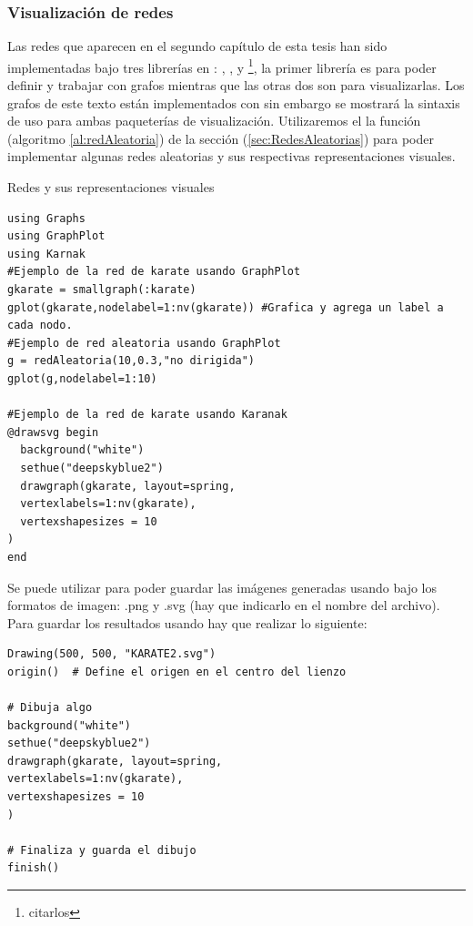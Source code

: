\subsubsection{Visualización de redes}

Las redes que aparecen en el segundo capítulo de esta tesis han sido implementadas bajo tres librerías en \julia: \href{https://github.com/JuliaGraphs/Graphs.jl}{}, \href{https://github.com/JuliaGraphs/GraphPlot.jl}{}, y \href{https://github.com/cormullion/Karnak.jl}{}\footnote{citarlos}, la primer librería es para poder definir y trabajar con grafos mientras que las otras dos son para visualizarlas. Los grafos de este texto están implementados con  sin embargo se mostrará la sintaxis de uso para ambas paqueterías de visualización. Utilizaremos el la función  (algoritmo \ref{al:redAleatoria}) de la sección (\ref{sec:RedesAleatorias}) para poder implementar algunas redes aleatorias y sus respectivas representaciones visuales.
\begin{algorithm}
	\caption{Redes y sus representaciones visuales}
	\label{al:implementacionRedes}
	\begin{verbatim}
using Graphs
using GraphPlot
using Karnak
#Ejemplo de la red de karate usando GraphPlot
gkarate = smallgraph(:karate)
gplot(gkarate,nodelabel=1:nv(gkarate)) #Grafica y agrega un label a cada nodo.
#Ejemplo de red aleatoria usando GraphPlot
g = redAleatoria(10,0.3,"no dirigida")
gplot(g,nodelabel=1:10)

#Ejemplo de la red de karate usando Karanak
@drawsvg begin
  background("white")
  sethue("deepskyblue2")
  drawgraph(gkarate, layout=spring,
  vertexlabels=1:nv(gkarate),
  vertexshapesizes = 10
)
end
	\end{verbatim}
\end{algorithm}

\setlength{\parindent}{0cm} Se puede utilizar  para poder guardar las imágenes generadas usando  bajo los formatos de imagen: .png y .svg (hay que indicarlo en el nombre del archivo). Para guardar los resultados usando  hay que realizar lo siguiente:
\newpage
\begin{verbatim}
Drawing(500, 500, "KARATE2.svg")
origin()  # Define el origen en el centro del lienzo

# Dibuja algo
background("white")
sethue("deepskyblue2")
drawgraph(gkarate, layout=spring,
vertexlabels=1:nv(gkarate),
vertexshapesizes = 10
)

# Finaliza y guarda el dibujo
finish()
\end{verbatim}

